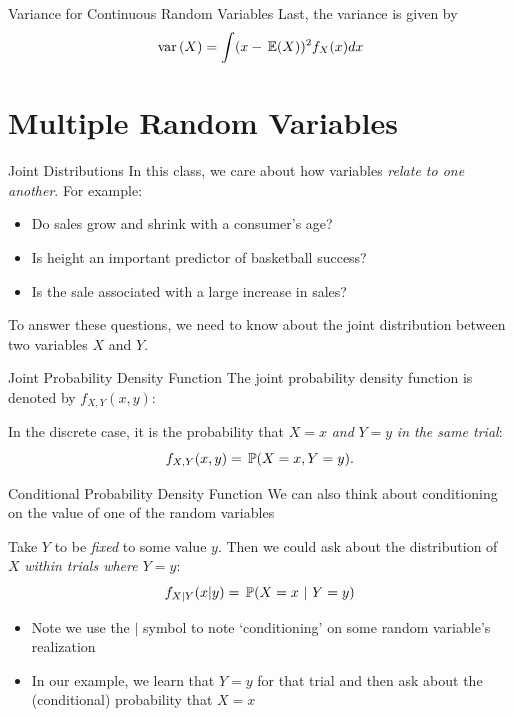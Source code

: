 \documentclass[aspectratio=169,t,11pt,table]{beamer}
\begin{document}
\begin{frame}{Variance for Continuous Random Variables}
  Last, the variance is given by
  $$
    \var{X} = \int (x - \expec{X})^2 f_{X}(x) dx
  $$
\end{frame}

\section{Multiple Random Variables}

\begin{frame}{Joint Distributions}
  In this class, we care about how variables \emph{relate to one another}. For example:
  \begin{itemize}
    \item Do sales grow and shrink with a consumer's age?
    
    \item Is height an important predictor of basketball success?
    
    \item Is the sale associated with a large increase in sales?
  \end{itemize}

  \pause
  \bigskip
  To answer these questions, we need to know about the \alert{joint distribution} between two variables $X$ and $Y$.
\end{frame}

\begin{frame}{Joint Probability Density Function}
  The \alert{joint probability density function} is denoted by $f_{X,Y}(x, y)$:
  
  \bigskip
  In the discrete case, it is the probability that $X = x$ \emph{and} $Y = y$ \emph{in the same trial}:
  \[
    f_{X,Y}(x, y) = \P{X = x, Y = y}.
  \]
\end{frame}

\begin{frame}{Conditional Probability Density Function}
  We can also think about \alert{conditioning} on the value of one of the random variables

  \bigskip
  Take $Y$ to be \emph{fixed} to some value $y$. Then we could ask about the distribution of $X$ \emph{within trials where $Y = y$}:
  \[
    f_{X \vert Y}(x \vert y) = \P{X = x}{Y = y}
  \]

  \pause
  \begin{itemize}
    \item Note we use the $\vert$ symbol to note `conditioning' on some random variable's realization
    
    \pause
    \item In our example, we learn that $Y = y$ for that trial and then ask about the (conditional) probability that $X = x$
  \end{itemize}
\end{frame}
\end{document}
